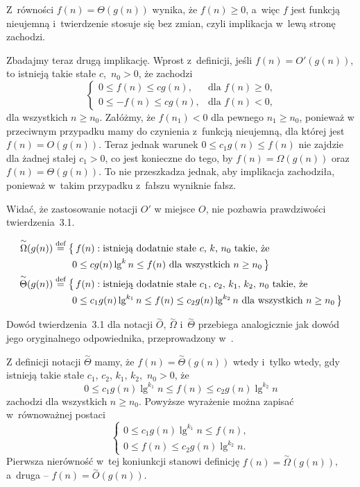 Z~równości $f(n)=\Theta(g(n))$ wynika, że $f(n)\ge0$, a~więc $f$ jest funkcją nieujemną i~twierdzenie stosuje się bez zmian, czyli implikacja w~lewą stronę zachodzi.

Zbadajmy teraz drugą implikację. Wprost z~definicji, jeśli $f(n)=O'(g(n))$, to istnieją takie stałe $c$,~$n_0>0$, że zachodzi
\[
	\begin{cases}
		0 \le f(n) \le cg(n), & \text{dla $f(n)\ge0$,} \\
		0 \le -f(n) \le cg(n), & \text{dla $f(n)<0$,}
	\end{cases}
\]
dla wszystkich $n\ge n_0$. Załóżmy, że $f(n_1)<0$ dla pewnego $n_1\ge n_0$, ponieważ w przeciwnym przypadku mamy do czynienia z~funkcją nieujemną, dla której jest $f(n)=O(g(n))$. Teraz jednak warunek $0\le c_1g(n)\le f(n)$ nie zajdzie dla żadnej stałej $c_1>0$, co jest konieczne do tego, by $f(n)=\Omega(g(n))$ oraz $f(n)=\Theta(g(n))$. To nie przeszkadza jednak, aby implikacja zachodziła, ponieważ w~takim przypadku z~fałszu wyniknie fałsz.

Widać, że zastosowanie notacji $O'$ w miejsce $O$, nie pozbawia prawdziwości twierdzenia~3.1.

\subexercise{} %
\[
	\begin{split}
		\overset{\sim}{\Omega}(g(n)) &\stackrel{\text{\scriptsize def}}{=} \bigl\{\,f(n):\text{istnieją dodatnie stałe $c$,~$k$,~$n_0$ takie, że} \\
		&\qquad 0 \le cg(n)\lg^kn \le f(n) \text{ dla wszystkich $n \ge n_0$}\,\bigr\} \\
		\overset{\sim}{\Theta}(g(n)) &\stackrel{\text{\scriptsize def}}{=} \bigl\{\,f(n):\text{istnieją dodatnie stałe $c_1$,~$c_2$,~$k_1$,~$k_2$,~$n_0$ takie, że} \\
		&\qquad 0 \le c_1g(n)\lg^{k_1}n \le f(n) \le c_2g(n)\lg^{k_2}n \text{ dla wszystkich $n \ge n_0$}\,\bigr\}
	\end{split}
\]

Dowód twierdzenia~3.1 dla notacji $\overset{\sim}{O}$, $\overset{\sim}{\Omega}$ i~$\overset{\sim}{\Theta}$ przebiega analogicznie jak dowód jego oryginalnego odpowiednika, przeprowadzony w~.

Z definicji notacji $\overset{\sim}{\Theta}$ mamy, że $f(n)=\overset{\sim}{\Theta}(g(n))$ wtedy i~tylko wtedy, gdy istnieją takie stałe $c_1$, $c_2$, $k_1$, $k_2$,~$n_0>0$, że
\[
	0 \le c_1g(n)\lg^{k_1}n \le f(n) \le c_2g(n)\lg^{k_2}n
\]
zachodzi dla wszystkich $n\ge n_0$. Powyższe wyrażenie można zapisać w~równoważnej postaci
\[
	\begin{cases}
		0 \le c_1g(n)\lg^{k_1}n \le f(n), \\
		0 \le f(n) \le c_2g(n)\lg^{k_2}n.
	\end{cases}
\]
Pierwsza nierówność w~tej koniunkcji stanowi definicję $f(n)=\overset{\sim}{\Omega}(g(n))$, a~druga -- $f(n)=\overset{\sim}{O}(g(n))$.


